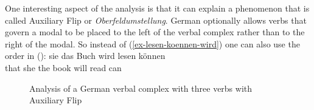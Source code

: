 One interesting aspect of the analysis is that it can explain a phenomenon that is called Auxiliary
Flip or \emph{Oberfeldumstellung}. German optionally allows verbs that govern a modal to be placed
to the left of the verbal complex rather than to the right of the modal. So instead of
(\ref{ex-lesen-koennen-wird}) one can also use the order in ():
\ea
\gll [dass] sie das Buch wird lesen können\\
     \spacebr{}that she the book will read can\\
\z
\begin{figure}
\caption{\label{fig-wird-lesen-koennen}Analysis of a German verbal complex with three verbs with
  Auxiliary Flip}
\end{figure}

